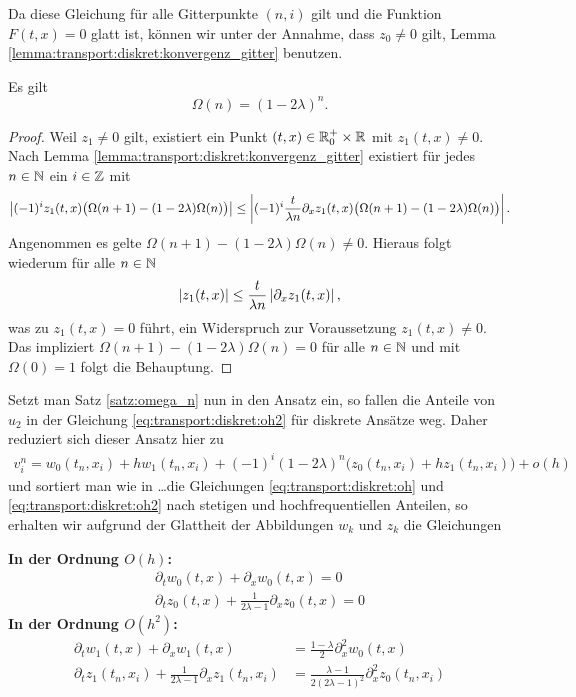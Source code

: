 Da diese Gleichung für alle Gitterpunkte $(n,i)$ gilt und die Funktion $F(t,x) = 0$ glatt ist, können wir unter der Annahme, dass $z_0 \neq 0$ gilt, Lemma \ref{lemma:transport:diskret:konvergenz_gitter} benutzen.
\begin{satz}\label{satz:omega_n}
Es gilt
\[ \Omega(n) = (1 - 2 \lambda)^n. \]
\end{satz}
\begin{proof}
Weil $z_1 \neq 0$ gilt, existiert ein Punkt $(t,x) \in \mathbb R^+_0 \times \mathbb R$ mit $z_1(t,x) \neq 0$.
Nach Lemma \ref{lemma:transport:diskret:konvergenz_gitter} existiert für jedes $n \in \mathbb N$ ein $i \in \mathbb Z$ mit
\[  \left| (-1)^i z_1(t, x) \bigl( \Omega(n+1) - ( 1 - 2 \lambda ) \Omega(n) \bigr) \right| \leq \left| (-1)^i \frac {t}{\lambda n} \partial_x z_1(t, x) \bigl( \Omega(n+1) - ( 1 - 2 \lambda ) \Omega(n) \bigr) \right|. \]
Angenommen es gelte $\Omega(n+1) - ( 1 - 2 \lambda ) \Omega(n) \neq 0$.
Hieraus folgt wiederum für alle $n \in \mathbb N$
\[ \left| z_1(t, x) \right| \leq \frac {t}{\lambda n} \left| \partial_x z_1(t,x) \right|, \]
was zu $z_1(t,x) = 0$ führt, ein Widerspruch zur Voraussetzung $z_1(t,x) \neq 0$.
Das impliziert $\Omega(n+1) - ( 1 - 2 \lambda ) \Omega(n) = 0$ für alle $n \in \mathbb N$ und mit $\Omega(0) = 1$ folgt die Behauptung.
\end{proof}

Setzt man Satz \ref{satz:omega_n} nun in den Ansatz ein, so fallen die Anteile von $u_2$ in der Gleichung \eqref{eq:transport:diskret:oh2} für diskrete Ansätze weg.
Daher reduziert sich dieser Ansatz hier zu
\begin{align}\label{eq:transport:osz:ansatz}
v^n_i = w_0(t_n, x_i) + h  w_1(t_n, x_i) + (-1)^i (1 - 2 \lambda)^n \bigl( z_0(t_n, x_i) + h z_1(t_n, x_i) \bigr) + o(h)
\end{align}
und sortiert man wie in \ldots die Gleichungen \eqref{eq:transport:diskret:oh} und \eqref{eq:transport:diskret:oh2} nach stetigen und hochfrequentiellen Anteilen, so erhalten wir aufgrund der Glattheit der Abbildungen $w_k$ und $z_k$ die Gleichungen

\vspace{0.4cm}
\noindent \textbf{In der Ordnung $O(h)$:}
\begin{align}
\partial_t w_0(t, x) + \partial_x w_0(t, x) = 0 \label{eq:transport:osz:oh_A}\\
\partial_t z_0(t, x) + \frac {1} {2\lambda - 1} \partial_x z_0(t, x) = 0 \label{eq:transport:osz:oh_B}
\end{align}
\vspace{0.4cm}
\noindent \textbf{In der Ordnung $O(h^2)$:}
\begin{align}\label{eq:transport:osz:oh2}
\partial_t w_1(t, x) + \partial_x w_1(t, x) &= \frac {1 - \lambda}{2} \partial^2_x w_0(t, x)\\
\partial_t z_1(t_n, x_i) + \frac{1}{2 \lambda - 1} \partial_x z_1(t_n, x_i) &= \frac{\lambda - 1}{2 (2 \lambda - 1)^2} \partial^2_x z_0(t_n, x_i)
\end{align}

